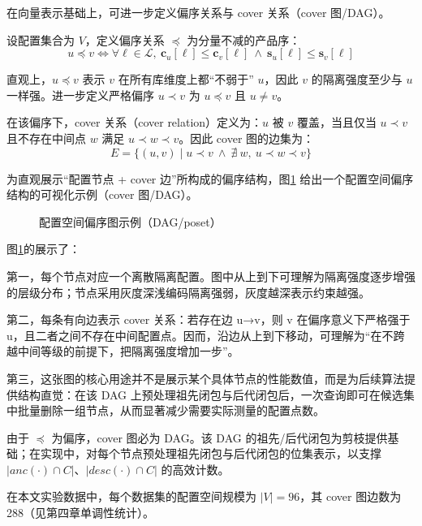 \documentclass[UTF8,a4paper,12pt]{ctexart}
\numberwithin{equation}{section}
\begin{document}
在向量表示基础上，可进一步定义偏序关系与 cover 关系（cover 图/DAG）。

设配置集合为 \(V\)，定义偏序关系 \(\preceq\) 为分量不减的产品序：
\begin{equation}
u \preceq v \iff \forall \ell\in\mathcal{L},\ \mathbf{c}_u[\ell] \le \mathbf{c}_v[\ell]\ \wedge\ \mathbf{s}_u[\ell] \le \mathbf{s}_v[\ell]
\end{equation}

直观上，\(u\preceq v\) 表示 \(v\) 在所有库维度上都``不弱于'' \(u\)，因此
\(v\) 的隔离强度至少与 \(u\) 一样强。进一步定义严格偏序 \(u\prec v\) 为
\(u\preceq v\) 且 \(u\ne v\)。

在该偏序下，cover 关系（cover relation）定义为：\(u\) 被 \(v\)
覆盖，当且仅当 \(u\prec v\) 且不存在中间点 \(w\) 满足
\(u\prec w\prec v\)。因此 cover 图的边集为：
\begin{equation}
E = \{(u, v) \mid u \prec v \ \wedge\ \nexists\ w,\ u \prec w \prec v\}
\end{equation}

为直观展示``配置节点 + cover 边''所构成的偏序结构，图\ref{fig:fig08_plot}
给出一个配置空间偏序结构的可视化示例（cover 图/DAG）。
\begin{figure}
  \centering
  
  \caption{配置空间偏序图示例（DAG/poset）}
  \label{fig:fig08_plot}
\end{figure}

图\ref{fig:fig08_plot}的展示了：

第一，每个节点对应一个离散隔离配置。图中从上到下可理解为隔离强度逐步增强的层级分布；节点采用灰度深浅编码隔离强弱，灰度越深表示约束越强。

第二，每条有向边表示 cover 关系：若存在边 u→v，则 v 在偏序意义下严格强于
u，且二者之间不存在中间配置点。因而，沿边从上到下移动，可理解为``在不跨越中间等级的前提下，把隔离强度增加一步''。

第三，这张图的核心用途并不是展示某个具体节点的性能数值，而是为后续算法提供结构直觉：在该
DAG
上预处理祖先闭包与后代闭包后，一次查询即可在候选集中批量删除一组节点，从而显著减少需要实际测量的配置点数。

由于 \(\preceq\) 为偏序，cover 图必为 DAG。该 DAG
的祖先/后代闭包为剪枝提供基础；在实现中，对每个节点预处理祖先闭包与后代闭包的位集表示，以支撑
\(|anc(\cdot)\cap C|\)、\(|desc(\cdot)\cap C|\) 的高效计数。

在本文实验数据中，每个数据集的配置空间规模为 \(|V|=96\)，其 cover
图边数为 288（见第四章单调性统计）。
\end{document}
